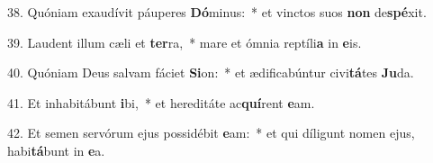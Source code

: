 38. Quóniam exaudívit páuperes \textbf{Dó}minus:~*  et vinctos suos \textbf{non} de\textbf{spé}xit.\

39. Laudent illum cæli et \textbf{ter}ra,~*  mare et ómnia reptíli\textbf{a} in \textbf{e}is.\

40. Quóniam Deus salvam fáciet \textbf{Si}on:~*  et ædificabúntur civi\textbf{tá}tes \textbf{Ju}da.\

41. Et inhabitábunt \textbf{i}bi,~*  et hereditáte ac\textbf{quí}rent \textbf{e}am.\

42. Et semen servórum ejus possidébit \textbf{e}am:~*  et qui díligunt nomen ejus, habi\textbf{tá}bunt in \textbf{e}a.\

